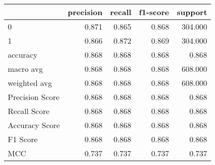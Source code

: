 \begin{tabular}{lrrrr}
\toprule
{} &  precision &  recall &  f1-score &  support \\
\midrule
0               &      0.871 &   0.865 &     0.868 &  304.000 \\
1               &      0.866 &   0.872 &     0.869 &  304.000 \\
accuracy        &      0.868 &   0.868 &     0.868 &    0.868 \\
macro avg       &      0.868 &   0.868 &     0.868 &  608.000 \\
weighted avg    &      0.868 &   0.868 &     0.868 &  608.000 \\
Precision Score &      0.868 &   0.868 &     0.868 &    0.868 \\
Recall Score    &      0.868 &   0.868 &     0.868 &    0.868 \\
Accuracy Score  &      0.868 &   0.868 &     0.868 &    0.868 \\
F1 Score        &      0.868 &   0.868 &     0.868 &    0.868 \\
MCC             &      0.737 &   0.737 &     0.737 &    0.737 \\
\bottomrule
\end{tabular}
